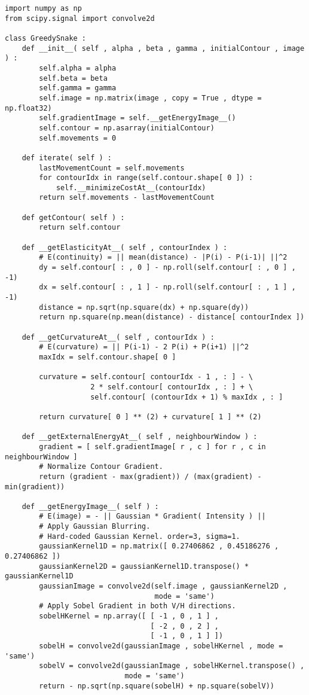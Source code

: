 \begin{lstlisting}[caption=Python implementation for Greedy Snake Contour,label=imp:snake]
import numpy as np
from scipy.signal import convolve2d

class GreedySnake :
    def __init__( self , alpha , beta , gamma , initialContour , image ) :
        self.alpha = alpha
        self.beta = beta
        self.gamma = gamma
        self.image = np.matrix(image , copy = True , dtype = np.float32)
        self.gradientImage = self.__getEnergyImage__()
        self.contour = np.asarray(initialContour)
        self.movements = 0

    def iterate( self ) :
        lastMovementCount = self.movements
        for contourIdx in range(self.contour.shape[ 0 ]) :
            self.__minimizeCostAt__(contourIdx)
        return self.movements - lastMovementCount

    def getContour( self ) :
        return self.contour

    def __getElasticityAt__( self , contourIndex ) :
        # E(continuity) = || mean(distance) - |P(i) - P(i-1)| ||^2
        dy = self.contour[ : , 0 ] - np.roll(self.contour[ : , 0 ] , -1)
        dx = self.contour[ : , 1 ] - np.roll(self.contour[ : , 1 ] , -1)
        distance = np.sqrt(np.square(dx) + np.square(dy))
        return np.square(np.mean(distance) - distance[ contourIndex ])

    def __getCurvatureAt__( self , contourIdx ) :
        # E(curvature) = || P(i-1) - 2 P(i) + P(i+1) ||^2
        maxIdx = self.contour.shape[ 0 ]

        curvature = self.contour[ contourIdx - 1 , : ] - \
                    2 * self.contour[ contourIdx , : ] + \
                    self.contour[ (contourIdx + 1) % maxIdx , : ]

        return curvature[ 0 ] ** (2) + curvature[ 1 ] ** (2)

    def __getExternalEnergyAt__( self , neighbourWindow ) :
        gradient = [ self.gradientImage[ r , c ] for r , c in neighbourWindow ]
        # Normalize Contour Gradient.
        return (gradient - max(gradient)) / (max(gradient) - min(gradient))

    def __getEnergyImage__( self ) :
        # E(image) = - || Gaussian * Gradient( Intensity ) ||
        # Apply Gaussian Blurring.
        # Hard-coded Gaussian Kernel. order=3, sigma=1.
        gaussianKernel1D = np.matrix([ 0.27406862 , 0.45186276 , 0.27406862 ])
        gaussianKernel2D = gaussianKernel1D.transpose() * gaussianKernel1D
        gaussianImage = convolve2d(self.image , gaussianKernel2D ,
                                   mode = 'same')
        # Apply Sobel Gradient in both V/H directions.
        sobelHKernel = np.array([ [ -1 , 0 , 1 ] ,
                                  [ -2 , 0 , 2 ] ,
                                  [ -1 , 0 , 1 ] ])
        sobelH = convolve2d(gaussianImage , sobelHKernel , mode = 'same')
        sobelV = convolve2d(gaussianImage , sobelHKernel.transpose() ,
                            mode = 'same')
        return - np.sqrt(np.square(sobelH) + np.square(sobelV))


\end{lstlisting}
